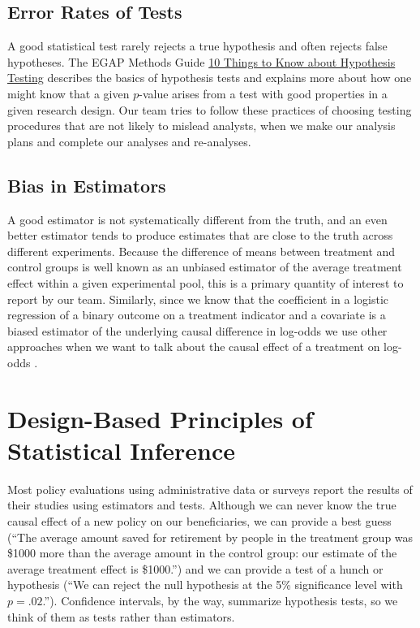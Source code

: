 \documentclass[
  12pt,
]{book}
\theoremstyle{definition}
\theoremstyle{definition}
\theoremstyle{definition}
\theoremstyle{remark}
\begin{document}
\hypertarget{error-rates-of-tests}{%
\section{Error Rates of Tests}\label{error-rates-of-tests}}

A good statistical test rarely rejects a true hypothesis and often
rejects false hypotheses. The EGAP Methods Guide
\href{https://egap.org/methods-guides/10-things-know-about-hypothesis-testing}{10
Things to Know about Hypothesis Testing} describes the basics of
hypothesis tests and explains more about how one might know that a given
\(p\)-value arises from a test with good properties in a given research
design. Our team tries to follow these practices of choosing testing
procedures that are not likely to mislead analysts, when we make our
analysis plans and complete our analyses and re-analyses.

\hypertarget{bias-in-estimators}{%
\section{Bias in Estimators}\label{bias-in-estimators}}

A good estimator is not systematically different from the truth, and an
even better estimator tends to produce estimates that are close to the
truth across different experiments. Because the difference of means
between treatment and control groups is well known as an unbiased
estimator of the average treatment effect within a given experimental
pool, this is a primary quantity of interest to report by our team.
Similarly, since we know that the coefficient in a logistic regression
of a binary outcome on a treatment indicator and a covariate is a biased
estimator of the underlying causal difference in log-odds we use other
approaches when we want to talk about the causal effect of a treatment
on log-odds \citep{freedman2008randomization}.

\hypertarget{design-based-principles-of-statistical-inference}{%
\chapter{Design-Based Principles of Statistical
Inference}\label{design-based-principles-of-statistical-inference}}

Most policy evaluations using administrative data or surveys report the
results of their studies using estimators and tests. Although we can
never know the true causal effect of a new policy on our beneficiaries,
we can provide a best guess (``The average amount saved for retirement
by people in the treatment group was \$1000 more than the average amount
in the control group: our estimate of the average treatment effect is
\$1000.'') and we can provide a test of a hunch or hypothesis (``We can
reject the null hypothesis at the 5\% significance level with
\(p=.02\).''). Confidence intervals, by the way, summarize hypothesis
tests, so we think of them as tests rather than estimators.
\end{document}
